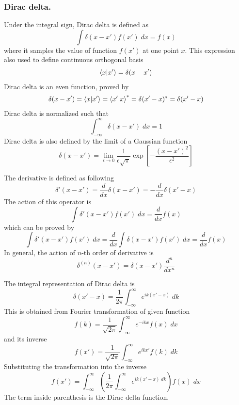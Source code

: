 \documentclass[../../../main.tex]{subfiles}
\begin{document}
\subsubsection{Dirac delta.}
Under the integral sign, Dirac delta is defined as
\begin{equation*}
	\int \delta(x-x')f(x')\;dx=f(x)
\end{equation*}
where it samples the value of function $f(x')$ at one point $x$.
This expression also used to define continuous orthogonal basis
\begin{equation*}
	\braket{x|x'}=\delta(x-x')
\end{equation*}
Dirac delta is an even function, proved by
\begin{equation*}
	\delta(x-x')=\braket{x|x'}=\braket{x'|x}^*=\delta(x'-x)^*=\delta(x'-x)
\end{equation*}
Dirac delta is normalized such that
\begin{equation*}
	\int_{-\infty}^{\infty}\delta(x-x')\;dx=1
\end{equation*}
Dirac delta is also defined by the limit of a Gaussian function
\begin{equation*}
	\delta (x-x')=\lim_{\epsilon \rightarrow 0}\frac{1}{\epsilon \sqrt{\pi}}\exp\left[-\frac{(x-x')^2 }{\epsilon^2}\right]
\end{equation*}

The derivative is defined as following
\begin{equation*}
	\delta'(x-x')=\frac{d }{dx}\delta(x-x')=-\frac{d }{dx}\delta(x'-x)
\end{equation*}
The action of this operator is
\begin{equation*}
	\int\delta'(x-x')f(x')\;dx=\frac{d }{dx} f(x)
\end{equation*}
which can be proved by
\begin{equation*}
	\int\delta'(x-x')f(x')\;dx=\frac{d }{dx }\int\delta(x-x')f(x')\;dx=\frac{d }{dx}f(x)
\end{equation*}
In general, the action of $n$-th order of derivative is
\begin{equation*}
	\delta^{(n)}(x-x')=\delta(x-x')\frac{d^n }{dx^n}
\end{equation*}

The integral representation of Dirac delta is
\begin{equation*}
	\delta(x'-x)=\frac{1 }{2\pi} \int_{-\infty}^{\infty} e^{ik(x'-x)}\;dk
\end{equation*}
This is obtained from Fourier transformation of given function
\begin{equation*}
	f(k)=\frac{1 }{\sqrt{2\pi }}\int_{-\infty}^{\infty} e^{-ikx}f(x)\;dx
\end{equation*}
and its inverse
\begin{equation*}
	f(x')=\frac{1 }{\sqrt{2\pi }}\int_{-\infty}^{\infty} e^{ikx'}f(k)\;dk
\end{equation*}
Substituting the transformation into the inverse
\begin{equation*}
	f(x')=\int_{-\infty}^{\infty} \left(\frac{1 }{2\pi}\int_{-\infty}^{\infty} e^{ik(x'-x)\;dk}\right)f(x)\;dx
\end{equation*}
The term inside parenthesis is the Dirac delta function.
\end{document}
